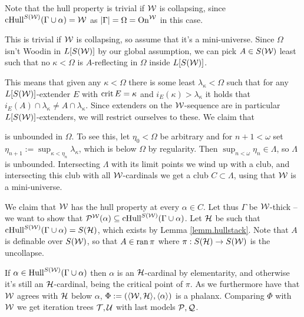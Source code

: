 
Note that the hull property is trivial if $\operatorname{\mathcal{W}}$ is collapsing, since $\operatorname{cHull}^{S(\operatorname{\mathcal{W}})}(\Gamma\cup\alpha)=\operatorname{\mathcal{W}}$ as $|\Gamma|=\Omega=\operatorname{On}^{\operatorname{\mathcal{W}}}$ in this case.

\pagebreak
{}
\proofretard
This is trivial if $\operatorname{\mathcal{W}}$ is collapsing, so assume that it's a mini-universe. Since $\Omega$ isn't Woodin in $L[S(\operatorname{\mathcal{W}})]$ by our global assumption, we can pick $A\in S(\operatorname{\mathcal{W}})$ least such that no $\kappa<\Omega$ is $A$-reflecting in $\Omega$ inside $L[S(\operatorname{\mathcal{W}})]$.

\qquad This means that given any $\kappa<\Omega$ there is some least $\lambda_\kappa<\Omega$ such that for any $L[S(\operatorname{\mathcal{W}})]$-extender $E$ with $\operatorname{crit} E=\kappa$ and $i_E(\kappa)>\lambda_\kappa$ it holds that $i_E(A)\cap\lambda_\kappa\neq A\cap\lambda_\kappa$. Since extenders on the $\operatorname{\mathcal{W}}$-sequence are in particular $L[S(\operatorname{\mathcal{W}})]$-extenders, we will restrict ourselves to these. We claim that

is unbounded in $\Omega$. To see this, let $\eta_0<\Omega$ be arbitrary and for $n+1<\omega$ set $\eta_{n+1}:=\sup_{\kappa<\eta_n}\lambda_\kappa$, which is below $\Omega$ by regularity. Then $\sup_{n<\omega}\eta_n\in\Lambda$, so $\Lambda$ is unbounded. Intersecting $\Lambda$ with its limit points we wind up with a club, and intersecting this club with all $\operatorname{\mathcal{W}}$-cardinals we get a club $C\subset\Lambda$, using that $\operatorname{\mathcal{W}}$ is a mini-universe.

\qquad We claim that $\operatorname{\mathcal{W}}$ has the hull property at every $\alpha\in C$. Let thus $\Gamma$ be $\operatorname{\mathcal{W}}$-thick -- we want to show that $\mathcal{P}^{\operatorname{\mathcal{W}}}(\alpha)\subseteq\operatorname{cHull}^{S(\operatorname{\mathcal{W}})}(\Gamma\cup\alpha)$. Let $\mathcal{H}$ be such that $\operatorname{cHull}^{S(\operatorname{\mathcal{W}})}(\Gamma\cup\alpha)=S(\mathcal{H})$, which exists by Lemma \ref{lemm.hullstack}. Note that $A$ is definable over $S(\operatorname{\mathcal{W}})$, so that $A\in\operatorname{ran}\pi$ where $\pi:S(\mathcal{H})\to S(\operatorname{\mathcal{W}})$ is the uncollapse.

\qquad If $\alpha\in\operatorname{Hull}^{S(\operatorname{\mathcal{W}})}(\Gamma\cup\alpha)$ then $\alpha$ is an $\mathcal{H}$-cardinal by elementarity, and otherwise it's still an $\mathcal{H}$-cardinal, being the critical point of $\pi$. As we furthermore have that $\operatorname{\mathcal{W}}$ agrees with $\mathcal{H}$ below $\alpha$, $\Phi:=(\langle \operatorname{\mathcal{W}},\mathcal{H}\rangle,\langle \alpha\rangle)$ is a phalanx. Comparing $\Phi$ with $\operatorname{\mathcal{W}}$ we get iteration trees $\operatorname{\mathcal{T}},\operatorname{\mathcal{U}}$ with last models $\mathcal{P},\operatorname{\mathcal{Q}}$.

